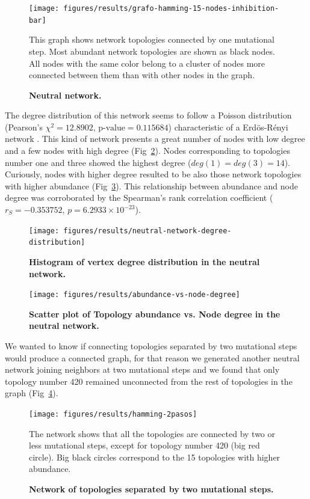 \documentclass[10pt,letterpaper]{article}
\begin{document}
\begin{figure}[!h]
 \texttt{[image: figures/results/grafo-hamming-15-nodes-inhibition-bar]}
 \caption{\bf Neutral network.}
 This graph shows network topologies connected by one mutational step. Most 
 abundant network topologies are shown as black nodes. All nodes with the same 
 color belong to a cluster of nodes more connected between them than with other 
 nodes in the graph.
 \label{fig:neutral-network}
\end{figure}

The degree distribution of this network seems to follow a Poisson distribution
(Pearson’s $\chi^2 = 12.8902$, $\text{p-value} = 0.115684$) characteristic of a 
Erdös-Rényi network \cite{Erdos1959}. This kind of network presents a great 
number of nodes with low degree and a few nodes with high degree 
(Fig~\ref{fig:deg-dist}). Nodes corresponding to topologies number one and three
showed the highest degree ($deg(1) = deg (3) = 14$). Curiously, nodes with 
higher degree resulted to be also those network topologies with higher abundance
(Fig~\ref{fig:ab-deg}). This relationship between abundance and node degree 
was corroborated by the Spearman's rank correlation coefficient 
($r_S = −0.353752$, $p = 6.2933\times10^{-23} $).

\begin{figure}[!h]
 \texttt{[image: figures/results/neutral-network-degree-distribution]}
 \caption{\bf Histogram of vertex degree distribution in the neutral network.}
 \label{fig:deg-dist}
\end{figure}

\begin{figure}[!h]
 \texttt{[image: figures/results/abundance-vs-node-degree]}
 \caption{\bf Scatter plot of Topology abundance vs. Node degree in the neutral
 network.}
 \label{fig:ab-deg}
\end{figure}

We wanted to know if connecting topologies separated by two mutational steps
would produce a connected graph, for that reason we generated another neutral
network joining neighbors at two mutational steps and we found that only 
topology number 420 remained unconnected from the rest of topologies in the 
graph (Fig~\ref{fig:2neut-net}).

\begin{figure}
 \texttt{[image: figures/results/hamming-2pasos]}
 \caption{\bf Network of topologies separated by two mutational steps.}
 The network shows that all the topologies are connected by two or less 
 mutational steps, except for topology number 420 (big red circle). Big black 
 circles correspond to the 15 topologies with higher abundance.
 \label{fig:2neut-net}
\end{figure}
\end{document}
